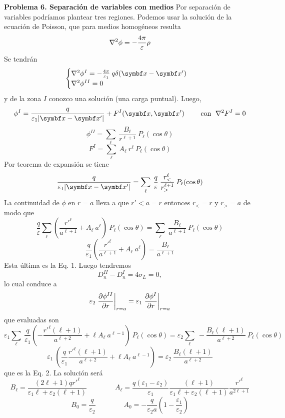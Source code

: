 \documentclass[10pt,oneside]{CBFT_book}
\begin{document}
\begin{ejemplo}{\bf Problema 6. Separación de variables con medios}
Por separación de variables podríamos plantear tres regiones.
Podemos usar la solución de la ecuación de Poisson, que para medios homogéneos
resulta
\[
	\nabla^2{\phi} = - \frac{4\pi}{\varepsilon} \rho	
\]
Se tendrán
\[
	\begin{cases}
	\lapm{\phi}^I = - \frac{4\pi}{\varepsilon_1} \: q\delta(\vbx -\vbx') \\
	\lapm{\phi}^{II} = 0 
	\end{cases}
\]
y de la zona $I$ conozco una solución (una carga puntual). Luego,
\[
	{\phi}^{I} = \frac{q}{\varepsilon_1|\vbx - \vbx'|} 
	+ F^I(\vbx,\vbx') \qquad \text{ con } \; \lapm{F}^I = 0
\]
\[
	{\phi}^{II} = \sum_{\ell} \: \frac{B_\ell}{r^{\ell + 1}} \: P_\ell(\cos\theta)
\]
\[
	F^{I} = \sum_{\ell} \: A_\ell \: r^\ell \: P_\ell(\cos\theta)
\]
Por teorema de expansión se tiene
\[
	\frac{q}{\varepsilon_1|\vbx - \vbx'|}  =
	\sum_{\ell} \: \frac{q}{\varepsilon} \: \frac{ r_<^\ell }{ r_>^{\ell+1} }
	\: P_\ell(\cos\theta)
\]	
La continuidad de $\phi$ en $r=a$ lleva a que $r'<a=r$ entonces $r_<=r$ y $r_>=a$
de modo que 
\[
	\frac{q}{\varepsilon} \sum_\ell \left( 
	\frac{ {r'}^\ell }{ a^{\ell+1} } + A_\ell \: a^\ell
	\right) \: P_\ell(\cos\theta) =
	\sum_\ell \: \frac{B_\ell}{a^{\ell +1}} \: P_\ell(\cos\theta)
\]
\[
	\frac{q}{\varepsilon_1} \left( 
	\frac{ {r'}^\ell }{ a^{\ell+1} } + A_\ell \: a^\ell \right) =
	\frac{B_\ell}{a^{\ell +1}} 
\]
Esta última es la Eq. 1.
Luego tendremos
\[
	D^{II}_n - D^{I}_n = 4 \sigma_L = 0,
\]
lo cual conduce a 
\[
	\varepsilon_2 \left. \frac{\partial^{\hspace{-0.05em}} {\phi^{II}}}{\partial {r}^{\hspace{-0.05em}}}\right|_{r=a} =
	\varepsilon_1 \left. \frac{\partial^{\hspace{-0.05em}} {\phi^{I}}}{\partial {r}^{\hspace{-0.05em}}}\right|_{r=a}
\]
que evaluadas son
\[
	\varepsilon_1 \sum_\ell \: \frac{q}{\varepsilon_1} \left( 
	-\frac{ {r'}^\ell (\ell +1)}{ a^{\ell+2} } + \ell A_\ell \: a^{\ell-1} \right)
	 \: P_\ell(\cos\theta) = \varepsilon_2 \sum_\ell \: 
	-\frac{B_\ell(\ell+1)}{a^{\ell +2}}  \: P_\ell(\cos\theta) 
\]
\[
	\varepsilon_1 \: \left(  \frac{q}{\varepsilon_1}
	\frac{ {r'}^\ell (\ell +1)}{ a^{\ell+2} } + \ell A_\ell \: a^{\ell-1} \right)
	= \varepsilon_2 \: \frac{B_\ell(\ell+1)}{a^{\ell +2}} 
\]
que es la Eq. 2.
La solución será
\[
	B_\ell = \frac{(2\ell + 1) q {r'}^\ell }{ \varepsilon_1 \ell + 
	\varepsilon_2 (\ell + 1) } \qquad \qquad 
	A_\ell = \frac{q(\varepsilon_1 - \varepsilon_2)}{\varepsilon_1}
	\frac{(\ell + 1)}{ \varepsilon_1 \ell + \varepsilon_2 (\ell + 1) }
	\frac{{r'}^\ell}{a^{2\ell +1}}
\]
\[
	B_0 =  \frac{q}{\varepsilon_2} \qquad \qquad 
	A_0 =  -\frac{q}{\varepsilon_2 a} \left( 1 - \frac{\varepsilon_1}{\varepsilon_2} \right)
\]


\end{ejemplo}
\end{document}
